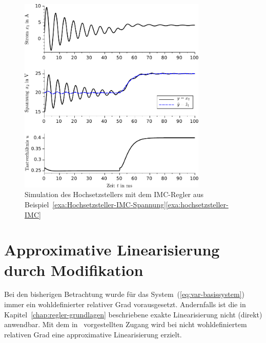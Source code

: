 \begin{figure}
\begin{centering}
\includegraphics[width=0.8\textwidth]{Hochsetzsteller_IMC_Spannung}
\par\end{centering}
\caption{Simulation des Hochsetzstellers mit dem IMC-Regler aus Beispiel~\ref{exa:Hochsetzsteller-IMC-Spannung}\ref{exa:hochsetzsteller-IMC}\label{fig:Hochsetzsteller-IMC-Spannung}}
\end{figure}


\section{Approximative Linearisierung durch Modifikation\label{sec:Approximative-Linearisierung-Modifikation}}

Bei den bisherigen Betrachtung wurde für das System~(\ref{eq:var-basissystem})
immer ein wohldefinierter relativer Grad vorausgesetzt. Andernfalls
ist die in Kapitel~\ref{chap:regler-grundlagen} beschriebene exakte
Linearisierung nicht (direkt) anwendbar. Mit dem in~\cite{hauser92}
vorgestellten Zugang wird bei nicht wohldefiniertem relativen Grad
eine approximative Linearisierung erzielt.

